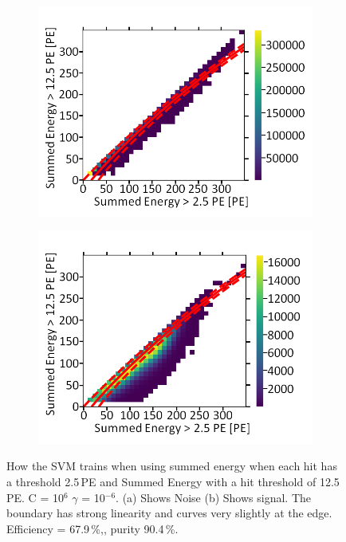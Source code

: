 \begin{figure}[!h]
\centering
\begin{subfigure}{.5\textwidth}
  \centering
  \includegraphics[width=\linewidth]{Appendix1/Figs/Sum1Sum2Noise.png}
  \captionsetup{width=.9\linewidth}
  \caption{}
  \label{subFig:}
\end{subfigure}%
\begin{subfigure}{.5\textwidth}
  \centering
\includegraphics[width=\linewidth]{Appendix1/Figs/Sum1Sum2Signal.png}
  \captionsetup{width=.9\linewidth}
  \caption{}
  \label{subFig:}
\end{subfigure}
\caption{How the SVM trains when using summed energy when each hit has a threshold 2.5\,PE and Summed Energy with a hit threshold of 12.5\,PE. C = 10$^6$ $\gamma$ = 10$^{-6}$. (a) Shows Noise (b) Shows signal. The boundary has strong linearity and curves very slightly at the edge. Efficiency = 67.9\,\%,, purity 90.4\,\%.}
\label{fig:}
\end{figure}


